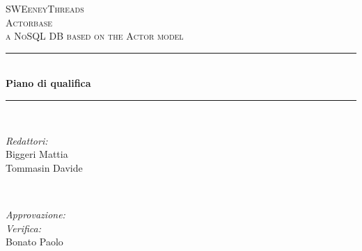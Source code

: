\documentclass[a4paper]{article}
\begin{document}
	\begin{titlepage}
		\newcommand{\HRule}{\rule{\linewidth}{0.5mm}} 
		\center  
		
		\textsc{\LARGE SWEeneyThreads}\\[1.5cm] 
		\textsc{\Large Actorbase}\\[0.5cm] 
		\textsc{\large a NoSQL DB based on the Actor model}\\[0.5cm]
		
		
		\HRule \\[0.4cm]
		{ \huge \bfseries Piano di qualifica}\\[0.4cm] 
		\HRule \\[1.5cm]
		
		\begin{minipage}{0.4\textwidth}
			\begin{flushleft} \large
				\emph{Redattori:}\\
				Biggeri Mattia\\
				Tommasin Davide\\
			\end{flushleft}
		\end{minipage}
		~
		\begin{minipage}{0.4\textwidth}
			\begin{flushright} \large
				\emph{Approvazione:} \\
				\emph{Verifica:} \\
				Bonato Paolo \\
			\end{flushright}
		\end{minipage}
		

\end{titlepage}
\end{document}
